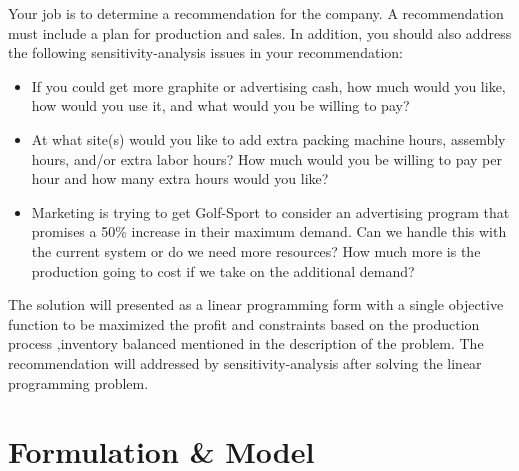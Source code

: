 \documentclass[12pt]{article}
\begin{document}
Your job is to determine a recommendation for the company. A recommendation must include a plan for production and sales. In addition, you should also address the following sensitivity-analysis issues in your recommendation:

\begin{itemize}
	\item If you could get more graphite or advertising cash, how much would you like, how would you use it, and what would you be willing to pay?
	\item At what site(s) would you like to add extra packing machine hours, assembly hours, and/or extra labor hours? How much would you be willing to pay per hour and how many extra hours would you like?
	\item Marketing is trying to get Golf-Sport to consider an advertising program that promises a 50\% increase in their maximum demand. Can we handle this with the current system or do we need more resources? How much more is the production going to cost if we take on the additional demand?
\end{itemize}
\par


The solution will presented as a linear programming form with a single objective function to be maximized the profit and constraints based on the production process ,inventory balanced mentioned in the description of the problem. The recommendation will addressed by sensitivity-analysis after solving the linear programming problem.

\newpage

\section{Formulation \& Model}
\end{document}
